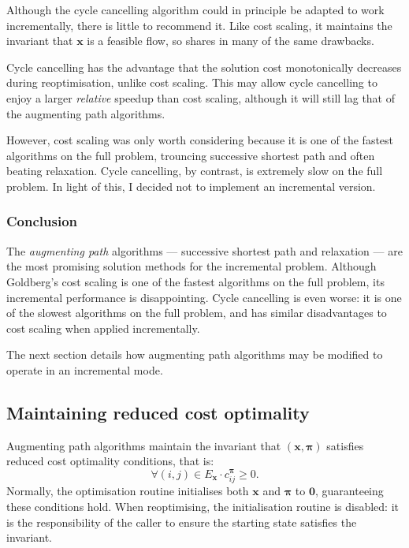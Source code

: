 Although the cycle cancelling algorithm could in principle be adapted to work incrementally, there is little to recommend it. Like cost scaling, it maintains the invariant that $\mathbf{x}$ is a feasible flow, so shares in many of the same drawbacks.  

Cycle cancelling has the advantage that the solution cost monotonically decreases during reoptimisation, unlike cost scaling\footnotemark. This may allow cycle cancelling to enjoy a larger \emph{relative} speedup than cost scaling, although it will still lag that of the augmenting path algorithms.

However, cost scaling was only worth considering because it is one of the fastest algorithms on the full problem, trouncing successive shortest path and often beating relaxation. Cycle cancelling, by contrast, is extremely slow on the full problem. In light of this, I decided not to implement an incremental version.

\subsubsection{Conclusion}

The \emph{augmenting path} algorithms --- successive shortest path and relaxation --- are the most promising solution methods for the incremental problem. Although Goldberg's cost scaling is one of the fastest algorithms on the full problem, its incremental performance is disappointing. Cycle cancelling is even worse: it is one of the slowest algorithms on the full problem, and has similar disadvantages to cost scaling when applied incrementally.

The next section details how augmenting path algorithms may be modified to operate in an incremental mode.

\subsection{Maintaining reduced cost optimality} \label{sec:impl-incremental-maintaining-rc}

Augmenting path algorithms maintain the invariant that $\left(\mathbf{x},\boldsymbol{\pi}\right)$ satisfies reduced cost optimality conditions, that is:
\[\forall(i,j)\in E_{\mathbf{x}}\cdot c_{ij}^{\boldsymbol{\pi}}\geq 0.\]
Normally, the optimisation routine initialises both $\mathbf{x}$ and $\boldsymbol{\pi}$ to $\mathbf{0}$, guaranteeing these conditions hold. When reoptimising, the initialisation routine is disabled: it is the responsibility of the caller to ensure the starting state satisfies the invariant.

